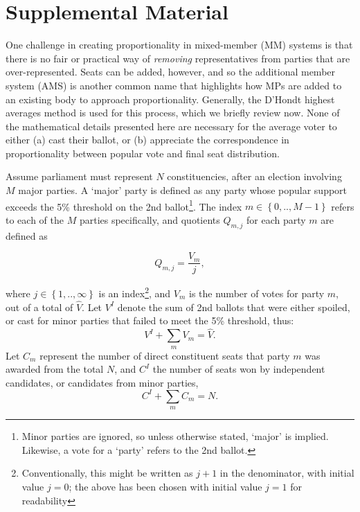 
\clearpage
\renewcommand{\theequation}{S.\arabic{equation}}
\renewcommand{\thesection}{S.\arabic{section}}
\setcounter{section}{0}
\setcounter{equation}{0}

\section*{Supplemental Material}

One challenge in creating proportionality in mixed-member (MM) systems is that there is no fair or practical way of \emph{removing} representatives from parties that are over-represented. 
Seats can be added, however, and so the additional member system (AMS) is another common name that highlights how MPs are added to an existing body to approach proportionality. 
Generally, the D'Hondt highest averages method is used for this process, which we briefly review now. None of the mathematical details presented here are necessary for the average voter to either (a) cast their ballot, or (b) appreciate the correspondence in proportionality between popular vote and final seat distribution.

Assume parliament must represent $N$ constituencies, after an election involving $M$ major parties. A `major' party is defined as any party whose popular support exceeds the 5\% threshold on the 2nd ballot\footnote{Minor parties are ignored, so unless otherwise stated, `major' is implied. Likewise, a vote for a `party' refers to the 2nd ballot.}. 
The index  $m \in \left\{0, .., M-1\right\} $  refers to each of the $M$ parties specifically, and quotients $Q_{m,j}$ for each party $m$ are defined as 

\begin{equation}
\label{eq:DhondtSupp}
Q_{m,j} = \frac{V_m}{j},
\end{equation}

where $j \in \left\{ 1,.., \infty \right\}$ is an index\footnote{Conventionally, this might be written as $j+1$ in the denominator, with initial value $j=0$; the above has been chosen with initial value $j=1$ for readability}, and  $V_m$ is the number of votes for party $m$, out of a total of $\hat{V}$. Let $V^I$ denote the sum of 2nd ballots that were either spoiled, or cast for minor parties that failed to meet the 5\% threshold, thus: 
\begin{equation}
\label{eq:sum_Vm}
V^I + \sum_m V_m = \hat{V}.
\end{equation}
Let $C_m$ represent the number of direct constituent seats that party $m$ was awarded from the total $N$, and $C^I$ the number of seats won by independent candidates, or candidates from minor parties,
\begin{equation}
\label{eq:sum_Cm}
C^I + \sum_m C_m = N.
\end{equation}

